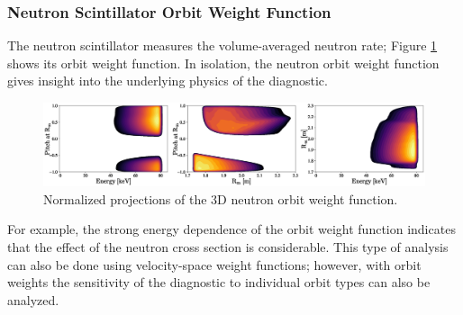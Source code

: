 \subsubsection{Neutron Scintillator Orbit Weight Function}
The neutron scintillator measures the volume-averaged neutron rate; Figure \ref{fig:neutron_orbit_weight} shows its orbit weight function.
In isolation, the neutron orbit weight function gives insight into the underlying physics of the diagnostic.
\begin{figure}[h!]
    \centering
    \includegraphics[width=17cm]{figures/neutron_orbit_weight.eps}
    \caption{Normalized projections of the 3D neutron orbit weight function.}
    \label{fig:neutron_orbit_weight}
\end{figure}
For example, the strong energy dependence of the orbit weight function indicates that the effect of the neutron cross section is considerable. This type of analysis can also be done using velocity-space weight functions; however, with orbit weights the sensitivity of the diagnostic to individual orbit types can also be analyzed.
